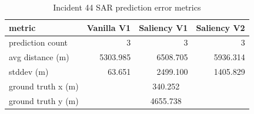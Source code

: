\begin{table}[ht]
\centering
\caption{Incident 44 SAR prediction error metrics}
\label{tab:sar-incident-44}
\begin{tabular}{lrrr}
\hline
metric & Vanilla V1 & Saliency V1 & Saliency V2 \\
\hline
prediction count & 3 & 3 & 3 \\
avg distance (m) & 5303.985 & 6508.705 & 5936.314 \\
stddev (m) & 63.651 & 2499.100 & 1405.829 \\
ground truth x (m) & \multicolumn{3}{c}{340.252} \\
ground truth y (m) & \multicolumn{3}{c}{4655.738} \\
\hline
\end{tabular}
\end{table}
